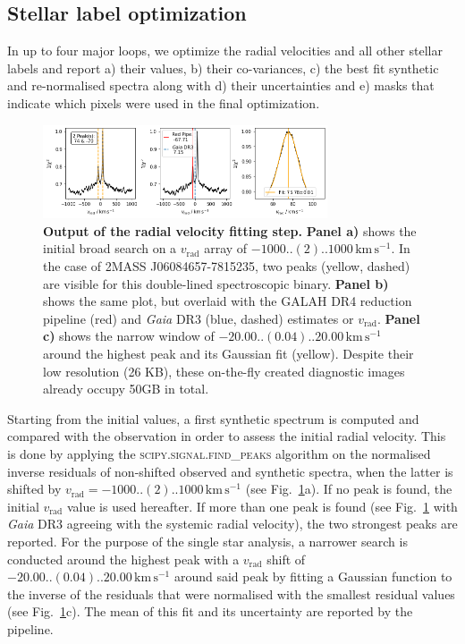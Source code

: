 \documentclass[
  journal=pasa,
  manuscript=research-paper, %
  year=2024,
  volume=37
]{cup-journal}
\newcommand{\vrad}{$v_\mathrm{rad}$\xspace}
\newcommand{\Gaia}{\textit{Gaia}\xspace}
\newcommand{\kms}{\,\mathrm{km\,s^{-1}}}	%
\begin{document}
\subsection{Stellar label optimization}
\label{sec:stellar_label_optimization}

In up to four major loops, we optimize the radial velocities and all other stellar labels and report a) their values, b) their co-variances, c) the best fit synthetic and re-normalised spectra along with d) their uncertainties and e) masks that indicate which pixels were used in the final optimization.

\begin{figure}[ht]
\centering
\includegraphics[width=0.75\textwidth]{figures/181221003101356_single_fit_rv.png}
\caption{\textbf{Output of the radial velocity fitting step.} \textbf{Panel a)} shows the initial broad search on a \vrad array of $-1000..(2)..1000\kms$. In the case of 2MASS J06084657-7815235, two peaks (yellow, dashed) are visible for this double-lined spectroscopic binary. \textbf{Panel b)} shows the same plot, but overlaid with the GALAH DR4 reduction pipeline (red) and \Gaia DR3 (blue, dashed) estimates or \vrad. \textbf{Panel c)} shows the narrow window of $-20.00..(0.04)..20.00\kms$ around the highest peak and its Gaussian fit (yellow). Despite their low resolution (26 KB), these on-the-fly created diagnostic images already occupy 50GB in total.}
\label{fig:181221003101356_single_fit_rv}
\end{figure}

Starting from the initial values, a first synthetic spectrum is computed and compared with the observation in order to assess the initial radial velocity. This is done by applying the \textsc{scipy.signal.find\_peaks} algorithm on the normalised inverse residuals of non-shifted observed and synthetic spectra, when the latter is shifted by $v_\text{rad} = -1000..(2)..1000\kms$ (see Fig.~\ref{fig:181221003101356_single_fit_rv}a). If no peak is found, the initial \vrad value is used hereafter. If more than one peak is found (see Fig.~\ref{fig:181221003101356_single_fit_rv} with \Gaia DR3 agreeing with the systemic radial velocity), the two strongest peaks are reported. For the purpose of the single star analysis, a narrower search is conducted around the highest peak with a \vrad shift of $-20.00..(0.04)..20.00\kms$ around said peak by fitting a Gaussian function to the inverse of the residuals that were normalised with the smallest residual values (see Fig.~\ref{fig:181221003101356_single_fit_rv}c). The mean of this fit and its uncertainty are reported by the pipeline.
\end{document}
